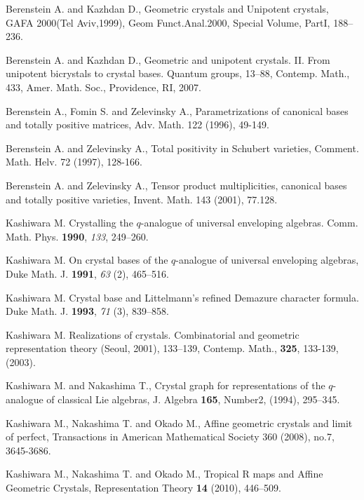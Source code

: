 \begin{thebibliography}{A}

 Berenstein A. and Kazhdan D., 
Geometric crystals and
Unipotent crystals, 
GAFA 2000(Tel Aviv,1999), Geom Funct.Anal.2000, 
Special Volume, PartI, 188--236.

 Berenstein A. and Kazhdan D., 
Geometric and unipotent crystals. II. 
From unipotent bicrystals to crystal bases. 
Quantum groups, 13--88, Contemp. Math., 433, 
Amer. Math. Soc., Providence, RI, 2007.

 Berenstein A., Fomin S. and Zelevinsky A., 
Parametrizations of canonical bases and totally positive matrices, 
Adv. Math. 122 (1996), 49-149. 

  Berenstein A. and Zelevinsky A., Total positivity 
in Schubert varieties, Comment. Math. Helv. 72 (1997), 128-166.

 Berenstein A. and Zelevinsky A., 
Tensor product multiplicities, canonical bases and totally positive
varieties, Invent. Math. 143 (2001), 77.128.

 Kashiwara M. Crystalling the $q$-analogue of universal 
              enveloping algebras. Comm. Math. Phys.
            {\bf 1990}, {\it 133}, 249--260.

 Kashiwara M.
 On crystal bases of the $q$-analogue of universal enveloping algebras,
	Duke Math. J. {\bf 1991}, {\it 63} (2), 465--516.

 Kashiwara M.
      Crystal base and Littelmann's refined Demazure character formula.
	     Duke Math. J. {\bf 1993}, {\it 71} (3), 839--858.

 Kashiwara M. Realizations of crystals. 
Combinatorial and geometric representation theory (Seoul, 2001), 
133--139, Contemp. Math., {\bf 325}, 133-139, (2003). 

  Kashiwara M. and Nakashima T.,
        Crystal graph for representations 
       of the $q$-analogue of classical Lie algebras, 
       J. Algebra {\bf 165}, Number2, (1994), 295--345.

 Kashiwara M., Nakashima T. and Okado M.,
Affine geometric crystals and limit of perfect,
Transactions in American Mathematical Society 360 (2008), no.7,
3645-3686.

 Kashiwara M., Nakashima T. and Okado M.,
Tropical R maps and  Affine Geometric Crystals,
Representation Theory {\bf 14} (2010), 446--509.


\end{thebibliography}
